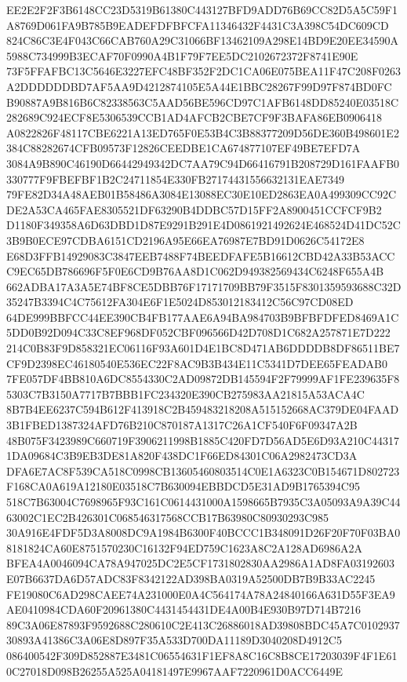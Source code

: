 \documentclass[UTF8,fontset=fandol,zihao=-4,a4paper]{ctexart}
\begin{document}
{{EE2E2F2F3B6148CC23D5319B61380C443127BFD9ADD76B69CC82D5A5C59F1A8769D061FA9B785B9EADEFDFBFCFA11346432F4431C3A398C54DC609CD
824C86C3E4F043C66CAB760A29C31066BF13462109A298E14BD9E20EE34590A5988C734999B3ECAF70F0990A4B1F79F7EE5DC2102672372F8741E90E
73F5FFAFBC13C5646E3227EFC48BF352F2DC1CA06E075BEA11F47C208F0263A2DDDDDDBD7AF5AA9D4212874105E5A44E1BBC28267F99D97F874BD0FC
B90887A9B816B6C82338563C5AAD56BE596CD97C1AFB6148DD85240E03518C282689C924ECF8E5306539CCB1AD4AFCB2CBE7CF9F3BAFA86EB0906418
A0822826F48117CBE6221A13ED765F0E53B4C3B88377209D56DE360B498601E2384C88282674CFB09573F12826CEEDBE1CA674877107EF49BE7EFD7A
3084A9B890C46190D66442949342DC7AA79C94D66416791B208729D161FAAFB0330777F9FBEFBF1B2C24711854E330FB27174431556632131EAE7349
79FE82D34A48AEB01B58486A3084E13088EC30E10ED2863EA0A499309CC92CDE2A53CA465FAE8305521DF63290B4DDBC57D15FF2A8900451CCFCF9B2
D1180F349358A6D63DBD1D87E9291B291E4D0861921492624E468524D41DC52C3B9B0ECE97CDBA6151CD2196A95E66EA76987E7BD91D0626C54172E8
E68D3FFB14929083C3847EEB7488F74BEEDFAFE5B16612CBD42A33B53ACCC9EC65DB786696F5F0E6CD9B76AA8D1C062D949382569434C6248F655A4B
662ADBA17A3A5E74BF8CE5DBB76F17171709BB79F3515F8301359593688C32D35247B3394C4C75612FA304E6F1E5024D853012183412C56C97CD08ED
64DE999BBFCC44EE390CB4FB177AAE6A94BA984703B9BFBFDFED8469A1C5DD0B92D094C33C8EF968DF052CBF096566D42D708D1C682A257871E7D222
214C0B83F9D858321EC06116F93A601D4E1BC8D471AB6DDDDB8DF86511BE7CF9D2398EC46180540E536EC22F8AC9B3B434E11C5341D7DEE65FEADAB0
7FE057DF4BB810A6DC8554330C2AD09872DB145594F2F79999AF1FE239635F85303C7B3150A7717B7BBB1FC234320E390CB275983AA21815A53ACA4C
8B7B4EE6237C594B612F413918C2B459483218208A515152668AC379DE04FAAD3B1FBED1387324AFD76B210C870187A1317C26A1CF540F6F09347A2B
48B075F3423989C660719F3906211998B1885C420FD7D56AD5E6D93A210C443171DA09684C3B9EB3DE81A820F438DC1F66ED84301C06A2982473CD3A
DFA6E7AC8F539CA518C0998CB13605460803514C0E1A6323C0B154671D802723F168CA0A619A12180E03518C7B630094EBBDCD5E31AD9B1765394C95
518C7B63004C7698965F93C161C0614431000A1598665B7935C3A05093A9A39C4463002C1EC2B426301C068546317568CCB17B63980C80930293C985
30A916E4FDF5D3A8008DC9A1984B6300F40BCCC1B348091D26F20F70F03BA08181824CA60E8751570230C16132F94ED759C1623A8C2A128AD6986A2A
BFEA4A0046094CA78A947025DC2E5CF1731802830AA2986A1AD8FA03192603E07B6637DA6D57ADC83F8342122AD398BA0319A52500DB7B9B33AC2245
FE19080C6AD298CAEE74A231000E0A4C564174A78A24840166A631D55F3EA9AE0410984CDA60F20961380C4431454431DE4A00B4E930B97D714B7216
89C3A06E87893F9592688C280610C2E413C26886018AD39808BDC45A7C010293730893A41386C3A06E8D897F35A533D700DA11189D3040208D4912C5
086400542F309D852887E3481C06554631F1EF8A8C16C8B8CE17203039F4F1E610C27018D098B26255A525A04181497E9967AAF7220961D0ACC6449E
}}
\end{document}
